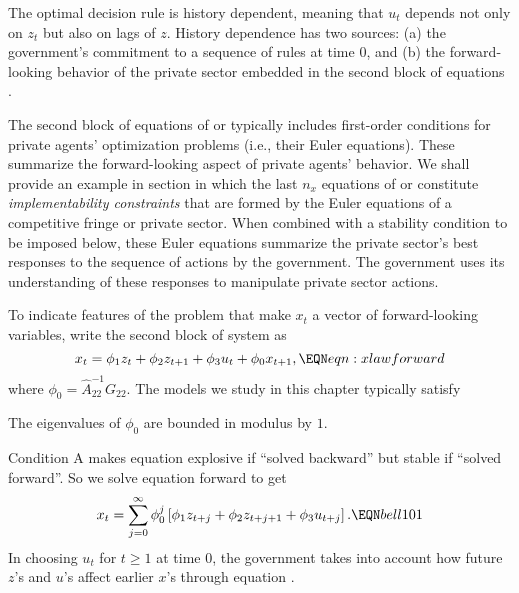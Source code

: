 \medskip

The  optimal decision rule  is history dependent, meaning that
$u_t$ depends not only on $z_t$ but also on lags of $z$.
 History
dependence has two sources: (a) the government's
commitment
 to a sequence of rules at time
$0$, and
(b) the forward-looking behavior of the
private sector embedded in the second block of equations
.

The  second
block of equations of   or 
typically includes first-order conditions
for private  agents' optimization problems (i.e., their Euler equations). These
summarize the forward-looking aspect of private agents' behavior.
We shall provide an example in section  in which
the last $n_x$ equations
of  or  constitute {\it implementability constraints} that
 are formed by the Euler equations  of a competitive fringe or
private sector.
When combined with a stability condition to be imposed below, these
Euler equations
summarize the private sector's best responses to the
sequence of actions by the government. The government uses its understanding of these responses
to manipulate private sector actions.

To indicate features of the problem that make $x_t$ a vector of forward-looking
variables, write the second block of system 
as
$$ x_t =  \phi_1 z_t + \phi_2 z_{t+1} +  \phi_3 u_t + \phi_0 x_{t+1} , \EQN eqn:xlawforward $$
where $\phi_0 = \hat A_{22}^{-1} G_{22}$.
The models we study in this chapter typically satisfy

The eigenvalues of $\phi_0$ %
are bounded in modulus by $1$. %

\medskip

\noindent Condition A makes equation  explosive if ``solved backward'' but stable if ``solved forward''. So we solve
equation  forward to get
$$ x_t = \sum_{j=0}^\infty \phi_0^j \left[ \phi_1 z_{t+j} + \phi_2 z_{t+j+1} + \phi_3 u_{t+j} \right] . \EQN bell101 $$
In choosing $u_t$ for $t \geq 1$ at time $0$, the government  takes into account how future $z$'s and $u$'s affect earlier
$x$'s through equation .


